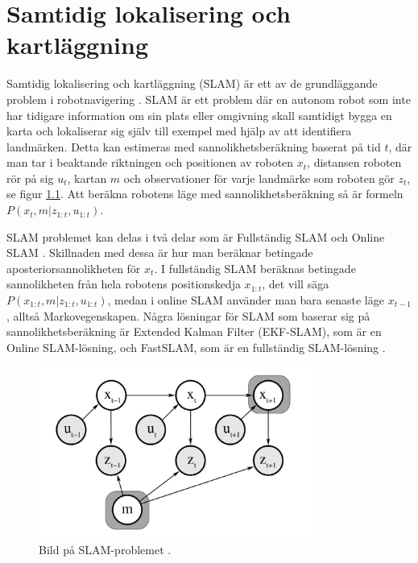 \chapter{Samtidig lokalisering och kartläggning}

Samtidig lokalisering och kartläggning (SLAM) är ett av de grundläggande problem i robotnavigering \citep{realslamproblem}. SLAM är ett problem där en autonom robot som inte har tidigare information om sin plats eller omgivning skall samtidigt bygga en karta och lokaliserar sig själv till exempel med hjälp av att identifiera landmärken. Detta kan estimeras med sannolikhetsberäkning baserat på tid $t$, där man tar i beaktande riktningen och positionen av roboten $x_t$, distansen roboten rör på sig $u_t$, kartan $m$ och observationer för varje landmärke som roboten gör $z_t$, se figur \ref{slam-problemet}. Att beräkna robotens läge med sannolikhetsberäkning så är formeln $P(x_t, m|z_{1:t}, u_{1:t})$. 

SLAM problemet kan delas i två delar som är Fullständig SLAM och Online SLAM \citep{ProbabilisticRobotics}. Skillnaden med dessa är hur man beräknar betingade aposteriorsannolikheten för $x_t$. I fullständig SLAM beräknas betingade sannolikheten från hela robotens positionskedja $x_{1:t}$, det vill säga $P(x_{1:t}, m | z_{1:t}, u_{1:t})$, medan i online SLAM använder man bara senaste läge $x_{t-1}$, alltså Markovegenskapen. Några lösningar för SLAM som baserar sig på sannolikhetsberäkning är Extended Kalman Filter (EKF-SLAM), som är en Online SLAM-lösning, och FastSLAM, som är en fullständig SLAM-lösning \citep{realslamproblem, ProbabilisticRobotics}. 

\begin{figure}[ht]
    \begin{center}
    \includegraphics[width=0.8\textwidth]{online-slam.JPG}
    \caption{Bild på SLAM-problemet \citep{ProbabilisticRobotics}.}
    \label{slam-problemet}
    \end{center}
\end{figure}

